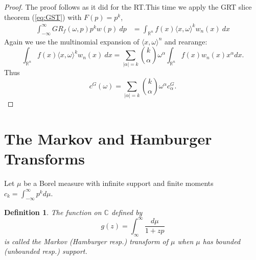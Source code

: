 \documentclass{amsart}
\newtheorem{definition}[theorem]{Definition}
\theoremstyle{remark}
\numberwithin{equation}{section}
\newcommand{\tc}{\textcolor{blue}}
\newcommand{\RR}{\mathbb{R}}
\newcommand{\CC}{\mathbb{C}}
\begin{document}
\begin{proof}
The proof follows as it did for the RT.\@ This time we apply the GRT slice theorem (\ref{eq:GST}) with $F(p) = p^k$, 
\begin{align*}
    \int_{-\infty}^\infty GR_f(\omega, p) p^k w(p) ~dp
    &= \int_{\RR^n} f(x) \langle x, \omega \rangle^k w_n(x) ~dx
\end{align*}
Again we use the multinomial expansion of $\langle x, \omega\rangle^n$ and rearange:
\[
    \int_{\RR^n} f(x) \langle x, \omega \rangle^k w_n(x) ~dx
    = \sum_{|\alpha| = k} \binom{k}{\alpha} \omega^\alpha \int_{\RR^n} f(x) w_n(x)x^\alpha dx. 
\]
Thus
\[
    c^G(\omega) = \sum_{|\alpha| = k} \binom{k}{\alpha} \omega^\alpha c^G_\alpha.
\]
\end{proof}


\newpage
\section{The Markov and Hamburger Transforms}
Let $\mu$ be a Borel measure with infinite support and finite moments $c_k = \int_{-\infty}^\infty p^k d\mu$. 

\begin{definition}
The function on $\CC$ defined by
\[
    g(z) = \int_\infty^\infty\frac{d\mu}{1+zp}
\]
is called the Markov (Hamburger resp.) transform of $\mu$ when $\mu$ has bounded (unbounded resp.) support.
\end{definition}
\end{document}
